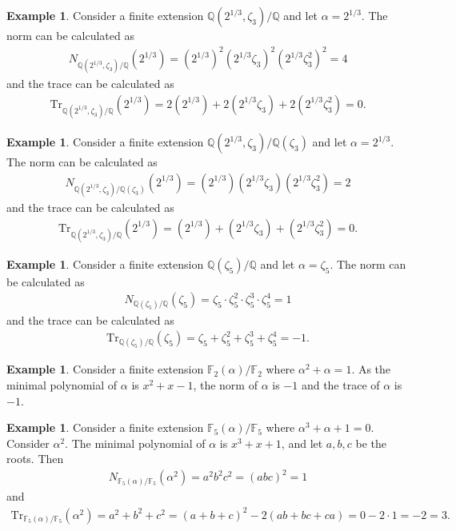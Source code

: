 \documentclass[12pt]{report}
\theoremstyle{plain}
\theoremstyle{remark}
\theoremstyle{definition}
\newtheorem{example}[theorem]{Example}
\newcommand{\Q}{\mathbb{Q}}
\begin{document}
\begin{example}
    Consider a finite extension $\Q(2^{1/3},\zeta_3)/\Q$ and let $\alpha=2^{1/3}$. The norm can be calculated as
    \begin{align*}
        N_{\Q(2^{1/3},\zeta_3)/\Q}(2^{1/3}) = (2^{1/3})^2(2^{1/3}\zeta_3)^2(2^{1/3}\zeta_3^2)^2=4
    \end{align*}
    and the trace can be calculated as
    \begin{align*}
        \mathrm{Tr}_{\Q(2^{1/3},\zeta_3)/\Q}(2^{1/3}) = 2(2^{1/3})+2(2^{1/3}\zeta_3)+2(2^{1/3}\zeta_3^2)=0.
    \end{align*}
\end{example}

\begin{example}
    Consider a finite extension $\Q(2^{1/3},\zeta_3)/\Q(\zeta_3)$ and let $\alpha=2^{1/3}$. The norm can be calculated as
    \begin{align*}
        N_{\Q(2^{1/3},\zeta_3)/\Q(\zeta_3)}(2^{1/3}) = (2^{1/3})(2^{1/3}\zeta_3)(2^{1/3}\zeta_3^2)=2
    \end{align*}
    and the trace can be calculated as
    \begin{align*}
        \mathrm{Tr}_{\Q(2^{1/3},\zeta_3)/\Q}(2^{1/3}) = (2^{1/3})+(2^{1/3}\zeta_3)+(2^{1/3}\zeta_3^2)=0.
    \end{align*}
\end{example}

\begin{example}
    Consider a finite extension $\Q(\zeta_5)/\Q$ and let $\alpha=\zeta_5$. The norm can be calculated as
    \begin{align*}
        N_{\Q(\zeta_5)/\Q}(\zeta_5) =  \zeta_5\cdot\zeta_5^2\cdot\zeta_5^3\cdot\zeta_5^4 = 1
    \end{align*}
    and the trace can be calculated as
    \begin{align*}
        \mathrm{Tr}_{\Q(\zeta_5)/\Q}(\zeta_5) = \zeta_5+\zeta_5^2+\zeta_5^3+\zeta_5^4 = -1.
    \end{align*}
\end{example}

\begin{example}
    Consider a finite extension $\mathbb{F}_2(\alpha)/\mathbb{F}_2$ where $\alpha^2+\alpha=1$. As the minimal polynomial of $\alpha$ is $x^2+x-1$, the norm of $\alpha$ is $-1$ and the trace of $\alpha$ is $-1$.
\end{example}

\begin{example}
    Consider a finite extension $\mathbb{F}_5(\alpha)/\mathbb{F}_5$ where $\alpha^3+\alpha+1=0$. Consider $\alpha^2$. The minimal polynomial of $\alpha$ is $x^3+x+1$, and let $a,b,c$ be the roots. Then
    \begin{align*}
        N_{\mathbb{F}_5(\alpha)/\mathbb{F}_5}(\alpha^2) = a^2b^2c^2 = (abc)^2 = 1
    \end{align*}
    and
    \begin{align*}
        \mathrm{Tr}_{\mathbb{F}_5(\alpha)/\mathbb{F}_5}(\alpha^2) = a^2+b^2+c^2 = (a+b+c)^2 - 2(ab+bc+ca) = 0-2\cdot 1 = -2 = 3.
    \end{align*}
\end{example}
\end{document}
